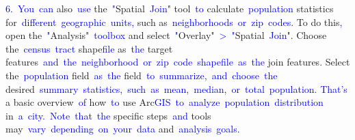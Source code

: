 \documentclass{article}
\begin{document}
\begin{tcolorbox}[colframe=black,colback=white]
{}\textcolor{blue}{6}\textcolor{blue}{.}\textcolor{blue}{~You}\textcolor{blue}{~can} also\textcolor{blue}{~use} the\textcolor{blue}{~"}Spatial\textcolor{blue}{~Join}" tool\textcolor{blue}{~to} calculate\textcolor{blue}{~population} statistics for\textcolor{blue}{~different}\textcolor{blue}{~geographic}\textcolor{blue}{~units}\textcolor{blue}{,} such as\textcolor{blue}{~neighborhoods}\textcolor{blue}{~or}\textcolor{blue}{~zip}\textcolor{blue}{~codes}. To do this\textcolor{blue}{,} open the\textcolor{blue}{~"}Analysis"\textcolor{blue}{~toolbox} and select\textcolor{blue}{~"}Overlay"\textcolor{blue}{~>}\textcolor{blue}{~"}Spatial\textcolor{blue}{~Join}". Choose the\textcolor{blue}{~census}\textcolor{blue}{~tract} shape\textcolor{blue}{file} as\textcolor{blue}{~the} target features\textcolor{blue}{~and}\textcolor{blue}{~the}\textcolor{blue}{~neighborhood}\textcolor{blue}{~or}\textcolor{blue}{~zip}\textcolor{blue}{~code}\textcolor{blue}{~shape}\textcolor{blue}{file}\textcolor{blue}{~as}\textcolor{blue}{~the} join features\textcolor{blue}{.} Select the\textcolor{blue}{~population} field\textcolor{blue}{~as}\textcolor{blue}{~the} field\textcolor{blue}{~to}\textcolor{blue}{~summarize},\textcolor{blue}{~and}\textcolor{blue}{~choose}\textcolor{blue}{~the} desired\textcolor{blue}{~summary}\textcolor{blue}{~statistics}\textcolor{blue}{,}\textcolor{blue}{~such}\textcolor{blue}{~as}\textcolor{blue}{~mean},\textcolor{blue}{~median}\textcolor{blue}{,}\textcolor{blue}{~or}\textcolor{blue}{~total}\textcolor{blue}{~population}\textcolor{blue}{.
}\textcolor{blue}{That}\textcolor{blue}{'s} a basic overview\textcolor{blue}{~of} how\textcolor{blue}{~to} use Arc\textcolor{blue}{GIS}\textcolor{blue}{~to}\textcolor{blue}{~analyze}\textcolor{blue}{~population}\textcolor{blue}{~distribution} in\textcolor{blue}{~a}\textcolor{blue}{~city}\textcolor{blue}{.}\textcolor{blue}{~Note}\textcolor{blue}{~that}\textcolor{blue}{~the} specific steps\textcolor{blue}{~and} tools may\textcolor{blue}{~vary}\textcolor{blue}{~depending}\textcolor{blue}{~on}\textcolor{blue}{~your}\textcolor{blue}{~data} and\textcolor{blue}{~analysis}\textcolor{blue}{~goals}\textcolor{blue}{.}\textcolor{blue}{}
\end{tcolorbox}
\end{document}
